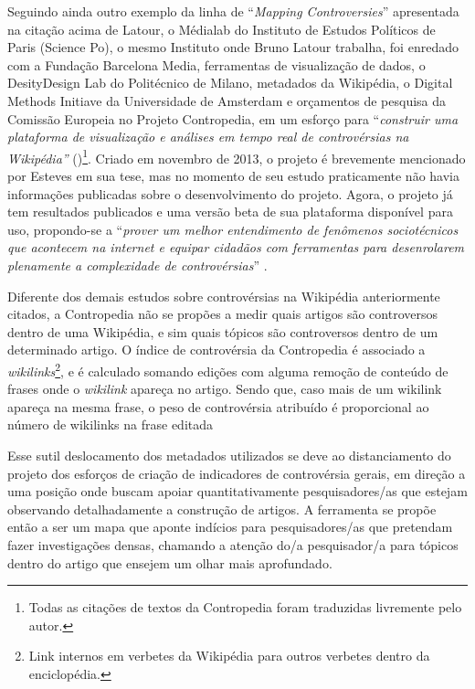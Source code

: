 Seguindo ainda outro exemplo da linha de “\textit{Mapping Controversies}” apresentada na citação acima de Latour, o Médialab do Instituto de Estudos Políticos de Paris (Science Po), o mesmo Instituto onde Bruno Latour trabalha, foi enredado com a Fundação Barcelona Media, ferramentas de visualização de dados, o DesityDesign Lab do Politécnico de Milano, metadados da Wikipédia, o Digital Methods Initiave da Universidade de Amsterdam e orçamentos de pesquisa da Comissão Europeia no Projeto Contropedia, em um esforço para “\textit{construir uma plataforma de visualização e análises em tempo real de controvérsias na Wikipédia”} (\cite{noauthor_site_2013})\footnote{Todas as citações de textos da Contropedia foram traduzidas livremente pelo autor.}. Criado em novembro de 2013, o projeto é brevemente mencionado por Esteves em sua tese, mas no momento de seu estudo praticamente não havia informações publicadas sobre o desenvolvimento do projeto. Agora, o projeto já tem resultados publicados e uma versão beta de sua plataforma disponível para uso, propondo-se a “\textit{prover um melhor entendimento de fenômenos sociotécnicos que acontecem na internet e equipar cidadãos com ferramentas para desenrolarem plenamente a complexidade de controvérsias}” \cite{noauthor_site_2013}.

Diferente dos demais estudos sobre controvérsias na Wikipédia  anteriormente citados, a Contropedia não se propões a medir quais artigos são controversos dentro de uma Wikipédia, e sim quais tópicos são controversos dentro de um determinado artigo. O índice de controvérsia da Contropedia é associado a \textit{wikilinks}\footnote{Link internos em verbetes da Wikipédia para outros verbetes dentro da enciclopédia.}, e é calculado somando edições com alguma remoção de conteúdo de frases onde o \textit{wikilink} apareça no artigo. Sendo que, caso mais de um wikilink apareça na mesma frase, o peso de controvérsia atribuído é proporcional ao número de wikilinks na frase editada \cite{borra_societal_2015}

Esse sutil deslocamento dos metadados utilizados se deve ao distanciamento do projeto dos esforços de criação de indicadores de controvérsia gerais, em direção a uma posição onde buscam apoiar quantitativamente pesquisadores/as que estejam observando detalhadamente a construção de artigos. A ferramenta se propõe então a ser um mapa que aponte indícios para pesquisadores/as que pretendam fazer investigações densas, chamando a atenção do/a pesquisador/a para tópicos dentro do artigo que ensejem um olhar mais aprofundado.

